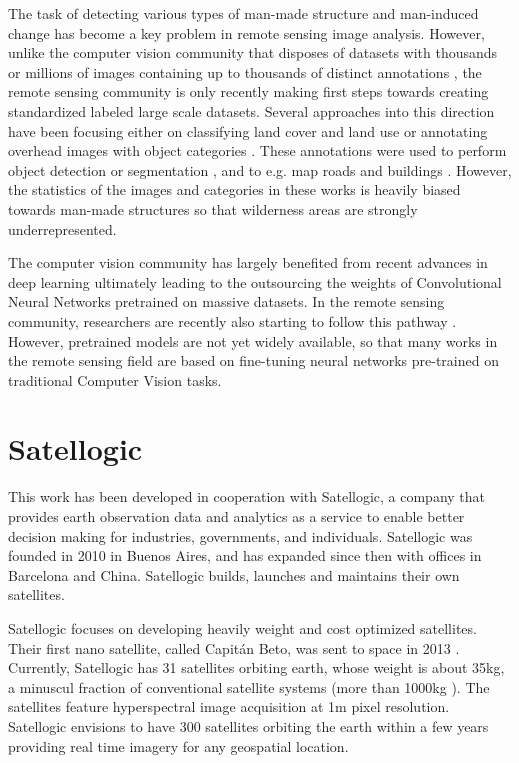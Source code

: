 The task of detecting various types of man-made structure and man-induced change has become a key problem in remote sensing image analysis. However, unlike the computer vision community that disposes of datasets with thousands or millions of images containing up to thousands of distinct annotations \parencite{everingham2010, deng2009, lin2014, krasin2016}, the remote sensing community is only recently making first steps towards creating standardized labeled large scale datasets. Several approaches into this direction have been focusing either on classifying land cover and land use \parencite{sumbul2019} or annotating overhead images with object categories \parencite{vanetten2018, lam2018}. These annotations were used to perform object detection or segmentation \parencite{yang2010, krasin2016}, and to e.g. map roads and buildings \parencite{vanetten2018, vanetten2019}. However, the statistics of the images and categories in these works is heavily biased towards man-made structures so that wilderness areas are strongly underrepresented. 

The computer vision community has largely benefited from recent advances in deep learning ultimately leading to the outsourcing the weights of Convolutional Neural Networks pretrained on massive datasets. In the remote sensing community, researchers are recently also starting to follow this pathway \parencite{sumbul2019}. However, pretrained models are not yet widely available, so that many works in the remote sensing field are based on fine-tuning neural networks  pre-trained on traditional Computer Vision tasks.

\section{Satellogic}
This work has been developed in cooperation with Satellogic, a company that provides earth observation data and analytics as a service to enable better decision making for industries, governments, and individuals. Satellogic was founded in 2010 in Buenos Aires, and has expanded since then with offices in Barcelona and China. Satellogic builds, launches and maintains their own satellites.

Satellogic focuses on developing heavily weight and cost optimized satellites. Their first nano satellite, called Capitán Beto, was sent to space in 2013 \parencite{wiki_satellogic}. Currently, Satellogic has 31 satellites orbiting earth, whose weight is about 35kg, a minuscul fraction of conventional satellite systems (more than 1000kg \parencite{satellogic_youtube}). The satellites feature hyperspectral image acquisition at 1m pixel resolution. Satellogic envisions to have 300 satellites orbiting the earth within a few years providing real time imagery for any geospatial location. 

